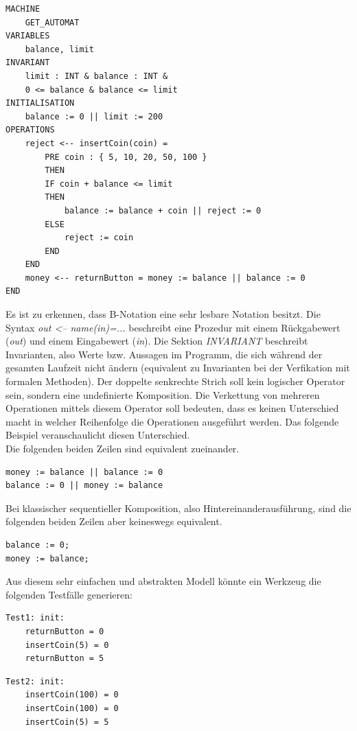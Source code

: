 \begin{lstlisting}[caption={Modell eines Getränkeautomaten in B-Notation},label=lst:b-notation]
MACHINE
	GET_AUTOMAT
VARIABLES
	balance, limit
INVARIANT
	limit : INT & balance : INT &
	0 <= balance & balance <= limit
INITIALISATION
	balance := 0 || limit := 200
OPERATIONS
	reject <-- insertCoin(coin) =
		PRE coin : { 5, 10, 20, 50, 100 }
		THEN
		IF coin + balance <= limit
		THEN
			balance := balance + coin || reject := 0
		ELSE
			reject := coin
		END
	END
	money <-- returnButton = money := balance || balance := 0
END
\end{lstlisting}

Es ist zu erkennen, dass B-Notation eine sehr lesbare Notation besitzt. Die Syntax \textit{out <-- name(in)=...} beschreibt eine Prozedur mit einem Rückgabewert (\textit{out}) und einem Eingabewert (\textit{in}). Die Sektion \textit{INVARIANT} beschreibt Invarianten, also Werte bzw. Aussagen im Programm, die sich während der gesamten Laufzeit nicht ändern (equivalent zu Invarianten bei der Verfikation mit formalen Methoden). Der doppelte senkrechte Strich soll kein logischer Operator sein, sondern eine undefinierte Komposition. Die Verkettung von mehreren Operationen mittels diesem Operator soll bedeuten, dass es keinen Unterschied macht in welcher Reihenfolge die Operationen ausgeführt werden. Das folgende Beispiel veranschaulicht diesen Unterschied.\\

Die folgenden beiden Zeilen sind equivalent zueinander.
\begin{verbatim}
money := balance || balance := 0
balance := 0 || money := balance
\end{verbatim}

Bei klassischer sequentieller Komposition, also Hintereinanderausführung, sind die folgenden beiden Zeilen aber keineswegs equivalent.
\begin{verbatim}
balance := 0;
money := balance;
\end{verbatim}

Aus diesem sehr einfachen und abstrakten Modell könnte ein Werkzeug die folgenden Testfälle generieren:\\

\begin{verbatim}
Test1: init:
	returnButton = 0
	insertCoin(5) = 0
	returnButton = 5
\end{verbatim}

\begin{verbatim}
Test2: init:
	insertCoin(100) = 0
	insertCoin(100) = 0
	insertCoin(5) = 5
\end{verbatim}

